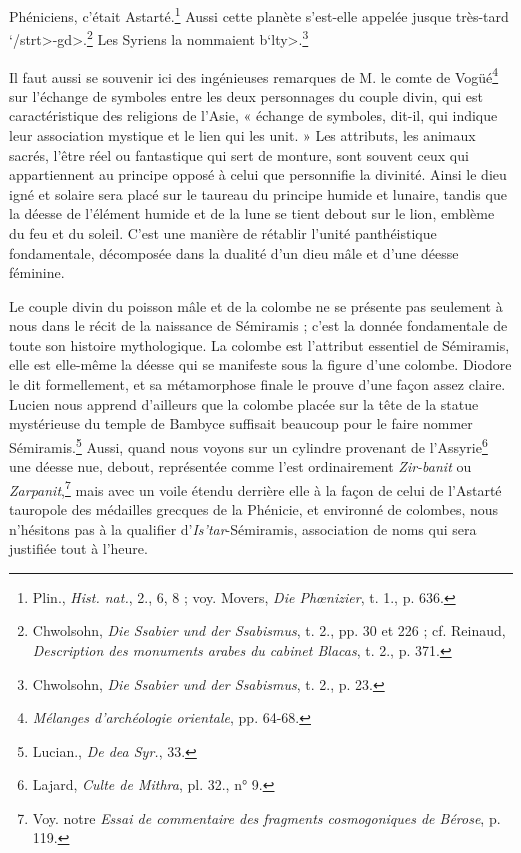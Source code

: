 \documentclass[a4paper, 11pt, oneside, landscape]{article}
\begin{document}
Phéniciens, c'était Astarté.\footnote{Plin., \emph{Hist. nat.}, 2., 6, 8 ; voy. Movers, \emph{Die Phœnizier}, t. 1., p. 636.} Aussi cette planète s'est-elle appelée jusque très-tard \<`/strt>-\<gd>.\footnote{Chwolsohn, \emph{Die Ssabier und der Ssabismus}, t. 2., pp. 30 et 226 ; cf. Reinaud, \emph{Description des monuments arabes du cabinet Blacas}, t. 2., p. 371.} Les Syriens la nommaient \<b`lty>.\footnote{Chwolsohn, \emph{Die Ssabier und der Ssabismus}, t. 2., p. 23.}

Il faut aussi se souvenir ici des ingénieuses remarques de M. le comte de Vogüé\footnote{\emph{Mélanges d'archéologie orientale}, pp. 64-68.} sur l'échange de symboles entre les deux personnages du couple divin, qui est caractéristique des religions de l'Asie, « échange de symboles, dit-il, qui indique leur association mystique et le lien qui les unit. » Les attributs, les animaux sacrés, l'être réel ou fantastique qui sert de monture, sont souvent ceux qui appartiennent au principe opposé à celui que personnifie la divinité. Ainsi le dieu igné et solaire sera placé sur le taureau du principe humide et lunaire, tandis que la déesse de l'élément humide et de la lune se tient debout sur le lion, emblème du feu et du soleil. C'est une manière de rétablir l'unité panthéistique fondamentale, décomposée dans la dualité d'un dieu mâle et d'une déesse féminine.

Le couple divin du poisson mâle et de la colombe ne se présente pas seulement à nous dans le récit de la naissance de Sémiramis ; c'est la donnée fondamentale de toute son histoire mythologique. La colombe est l'attribut essentiel de Sémiramis, elle est elle-même la déesse qui se manifeste sous la figure d'une colombe. Diodore le dit formellement, et sa métamorphose finale le prouve d'une façon assez claire. Lucien nous apprend d'ailleurs que la colombe placée sur la tête de la statue mystérieuse du temple de Bambyce suffisait beaucoup pour le faire nommer Sémiramis.\footnote{Lucian., \emph{De dea Syr.}, 33.} Aussi, quand nous voyons sur un cylindre provenant de l'Assyrie\footnote{Lajard, \emph{Culte de Mithra}, pl. 32., n° 9.} une déesse nue, debout, représentée comme l'est ordinairement \emph{Zir-banit} ou \emph{Zarpanit},\footnote{Voy. notre \emph{Essai de commentaire des fragments cosmogoniques de Bérose}, p. 119.} mais avec un voile étendu derrière elle à la façon de celui de l'Astarté tauropole des médailles grecques de la Phénicie, et environné de colombes, nous n'hésitons pas à la qualifier d'\emph{Is'tar}-Sémiramis, association de noms qui sera justifiée tout à l'heure.
\end{document}

